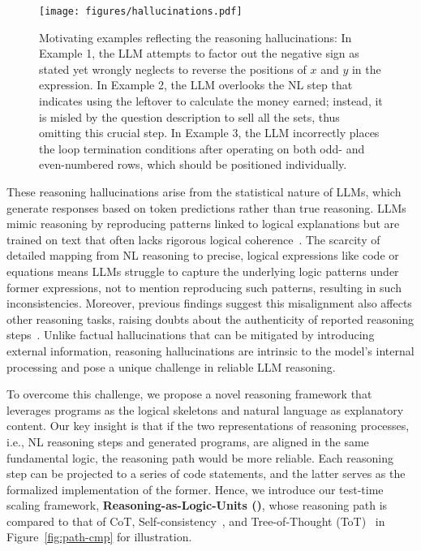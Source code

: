 \begin{figure*}[htbp]
    \centering
    \vspace{-0.1in}
        {\texttt{[image: figures/hallucinations.pdf]}}
    \vspace{-0.1in}
    \caption{Motivating examples reflecting the reasoning hallucinations: In Example 1, the LLM attempts to factor out the negative sign as stated yet wrongly neglects to reverse the positions of $x$ and $y$ in the expression. In Example 2, the LLM overlooks the NL step that indicates using the leftover to calculate the money earned; instead, it is misled by the question description to sell all the sets, thus omitting this crucial step. In Example 3, the LLM incorrectly places the loop termination conditions after operating on both odd- and even-numbered rows, which should be positioned individually.}
    \vspace{-0.2in}
    \label{fig:hallucinations}
\end{figure*}

These reasoning hallucinations arise from the statistical nature of LLMs, which generate responses based on token predictions rather than true reasoning.
LLMs mimic reasoning by reproducing patterns linked to logical explanations but are trained on text that often lacks rigorous logical coherence~\cite{Cyc}.
The scarcity of detailed mapping from NL reasoning to precise, logical expressions like code or equations means LLMs struggle to capture the underlying logic patterns under former expressions, not to mention reproducing such patterns, resulting in such inconsistencies.
Moreover, previous findings suggest this misalignment also affects other reasoning tasks, raising doubts about the authenticity of reported reasoning steps~\cite{HTL}. 
Unlike factual hallucinations that can be mitigated by introducing external information, reasoning hallucinations are intrinsic to the model's internal processing and pose a unique challenge in reliable LLM reasoning.

To overcome this challenge, we propose a novel reasoning framework that leverages programs as the logical skeletons and natural language as explanatory content.
Our key insight is that if the two representations of reasoning processes, i.e., NL reasoning steps and generated programs, are aligned in the same fundamental logic, the reasoning path would be more reliable. Each reasoning step can be projected to a series of code statements, and the latter serves as the formalized implementation of the former.
Hence, we introduce our test-time scaling framework, \textbf{Reasoning-as-Logic-Units (\tool)}, whose reasoning path is compared to that of CoT, Self-consistency~\cite{Self-Consistency}, and Tree-of-Thought (ToT)~\cite{ToT} in Figure~\ref{fig:path-cmp} for illustration.

